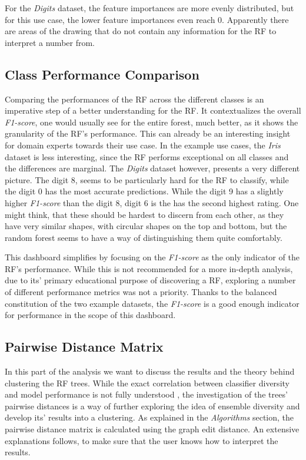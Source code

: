 \documentclass[a4paper, 12pt]{article}
\begin{document}
For the \textit{Digits} dataset, the feature importances are more evenly distributed, but for this use
case, the lower feature importances even reach 0. Apparently there are areas of the drawing that do not
contain any information for the RF to interpret a number from. \par

\subsection{Class Performance Comparison}
Comparing the performances of the RF across the different classes is an imperative step of a better
understanding for the RF. It contextualizes the overall \textit{F1-score}, one would usually see
for the entire forest, much better, as it shows the granularity of the RF's performance.
This can already be an interesting insight for domain experts towards their use case. In the example
use cases, the \textit{Iris} dataset is less interesting, since the RF performs exceptional on all
classes and the differences are marginal. The \textit{Digits} dataset however, presents a very different
picture. The digit 8, seems to be particularly hard for the RF to classify, while the digit 0 has the most
accurate predictions. While the digit 9 has a slightly higher \textit{F1-score} than the digit 8, digit 6
is the has the second highest rating. One might think, that these should be hardest to discern from each
other, as they have very similar shapes, with circular shapes on the top and bottom, but the random forest
seems to have a way of distinguishing them quite comfortably. \par

This dashboard simplifies by focusing on the \textit{F1-score} as the only indicator of the RF's
performance. While this is not recommended for a more in-depth analysis, due to its' primary educational
purpose of discovering a RF, exploring a number of different performance metrics was not a priority.
Thanks to the balanced constitution of the two example datasets, the \textit{F1-score} is a good enough
indicator for performance in the scope of this dashboard. \par

\subsection{Pairwise Distance Matrix}
In this part of the analysis we want to discuss the results and the theory behind clustering the RF trees.
While the exact correlation between classifier diversity and model performance is not fully understood
\cite{kuncheva2003measures}, the investigation of the trees' pairwise distances is a way of further exploring
the idea of ensemble diversity and develop its' results into a clustering.
As explained in the \textit{Algorithms} section, the pairwise distance matrix is calculated using the graph
edit distance. An extensive explanations follows, to make sure that the user knows how to interpret the
results. \par
\end{document}
